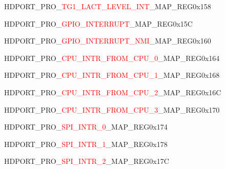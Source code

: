\vspace{-3em}
\begin{register}{H}{DPORT\_PRO\_\textcolor{red}{TG1\_LACT\_LEVEL\_INT}\_MAP\_REG}{0x158}\label{regdesc:PROTG1LACTLEVELINTMAPREG}
\end{register}
\vspace{-3em}
\begin{register}{H}{DPORT\_PRO\_\textcolor{red}{GPIO\_INTERRUPT}\_MAP\_REG}{0x15C}\label{regdesc:PROGPIOINTERRUPTMAPREG}
\end{register}
\vspace{-3em}
\begin{register}{H}{DPORT\_PRO\_\textcolor{red}{GPIO\_INTERRUPT\_NMI}\_MAP\_REG}{0x160}\label{regdesc:PROGPIOINTERRUPTNMIMAPREG}
\end{register}
\vspace{-3em}
\begin{register}{H}{DPORT\_PRO\_\textcolor{red}{CPU\_INTR\_FROM\_CPU\_0}\_MAP\_REG}{0x164}\label{regdesc:PROCPUINTRFROMCPU0MAPREG}
\end{register}
\vspace{-3em}
\begin{register}{H}{DPORT\_PRO\_\textcolor{red}{CPU\_INTR\_FROM\_CPU\_1}\_MAP\_REG}{0x168}\label{regdesc:PROCPUINTRFROMCPU1MAPREG}
\end{register}
\vspace{-3em}
\begin{register}{H}{DPORT\_PRO\_\textcolor{red}{CPU\_INTR\_FROM\_CPU\_2}\_MAP\_REG}{0x16C}\label{regdesc:PROCPUINTRFROMCPU2MAPREG}
\end{register}
\vspace{-3em}
\begin{register}{H}{DPORT\_PRO\_\textcolor{red}{CPU\_INTR\_FROM\_CPU\_3}\_MAP\_REG}{0x170}\label{regdesc:PROCPUINTRFROMCPU3MAPREG}
\end{register}
\vspace{-3em}
\begin{register}{H}{DPORT\_PRO\_\textcolor{red}{SPI\_INTR\_0}\_MAP\_REG}{0x174}\label{regdesc:PROSPIINTR0MAPREG}
\end{register}
\vspace{-3em}
\begin{register}{H}{DPORT\_PRO\_\textcolor{red}{SPI\_INTR\_1}\_MAP\_REG}{0x178}\label{regdesc:PROSPIINTR1MAPREG}
\end{register}
\vspace{-3em}
\begin{register}{H}{DPORT\_PRO\_\textcolor{red}{SPI\_INTR\_2}\_MAP\_REG}{0x17C}\label{regdesc:PROSPIINTR2MAPREG}
\end{register}

